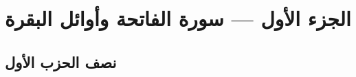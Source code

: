 \tableofcontents

\mainmatter

\part{الجزء الأول — سورة الفاتحة وأوائل البقرة}
\label{part:juz01}

\chapter{نصف الحزب الأول}
\label{chap:hizb01-nisf01}




\backmatter

\printindex


